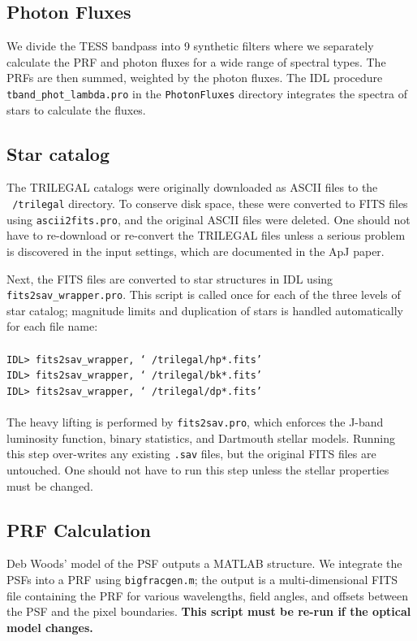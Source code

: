 \documentclass[preprint,10pt]{aastex}
\begin{document}
\subsection{Photon Fluxes}
We divide the TESS bandpass into 9 synthetic filters where we separately calculate the PRF and photon fluxes for a wide range of spectral types. The PRFs are then summed, weighted by the photon fluxes. 
The IDL procedure \texttt{tband\_phot\_lambda.pro} in the \texttt{PhotonFluxes} directory integrates the spectra of stars to calculate the fluxes.

\subsection{Star catalog}
The TRILEGAL catalogs were originally downloaded as ASCII files to the \texttt{~/trilegal} directory. 
To conserve disk space, these were converted to FITS files using \texttt{ascii2fits.pro}, and the original ASCII files were deleted. 
One should not have to re-download or re-convert the TRILEGAL files unless a serious problem is discovered in the input settings, which are documented in the ApJ paper. 

Next, the FITS files are converted to star structures in IDL using \texttt{fits2sav\_wrapper.pro}. This script is called once for each of the three levels of star catalog; magnitude limits and duplication of stars is handled automatically for each file name: \\
\\
\texttt{IDL> fits2sav\_wrapper, `~/trilegal/hp*.fits'}\\
\texttt{IDL> fits2sav\_wrapper, `~/trilegal/bk*.fits'}\\
\texttt{IDL> fits2sav\_wrapper, `~/trilegal/dp*.fits'}\\
\\
The heavy lifting is performed by \texttt{fits2sav.pro}, which enforces the J-band luminosity function, binary statistics, and Dartmouth stellar models.
Running this step over-writes any existing \texttt{.sav} files, but the original FITS files are untouched.
One should not have to run this step unless the stellar properties must be changed.

\subsection{PRF Calculation}
Deb Woods' model of the PSF outputs a MATLAB structure. 
We integrate the PSFs into a PRF using \texttt{bigfracgen.m}; the output is a multi-dimensional FITS file containing the PRF for various wavelengths, field angles, and offsets between the PSF and the pixel boundaries. \textbf{This script must be re-run if the optical model changes.}
\end{document}

